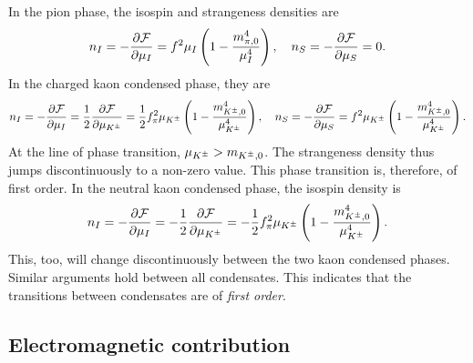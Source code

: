 In the pion phase, the isospin and strangeness densities are
%
\begin{equation}
    n_I = - \pdv{\mathcal{F}}{\mu_I} = f^2 \mu_I \left( 1 - \frac{m_{\pi,0}^4}{\mu_I^4} \right), \quad
    n_S = - \pdv{\mathcal{F}}{\mu_S} = 0.
\end{equation}
%
In the charged kaon condensed phase, they are
%
\begin{equation}
    n_I = - \pdv{\mathcal{F}}{\mu_I} 
    = \frac{1}{2} \pdv{\mathcal{F}}{\mu_{K^\pm}}
    = \frac{1}{2} f^2_\pi \mu_{K^\pm} \left( 1 - \frac{m_{{K^\pm},0}^4}{\mu_{K^\pm}^4} \right), \quad
    n_S = - \pdv{\mathcal{F}}{\mu_S} = f^2 \mu_{K^\pm}  \left( 1 - \frac{m_{{K^\pm},0}^4}{\mu_{K^\pm}^4} \right).
\end{equation}
%
At the line of phase transition, $\mu_{K^\pm} > m_{{K^\pm},0}$.
The strangeness density thus jumps discontinuously to a non-zero value.
This phase transition is, therefore, of first order.
In the neutral kaon condensed phase, the isospin density is
%
\begin{equation}
    n_I = - \pdv{\mathcal{F}}{\mu_I} 
    = -\frac{1}{2} \pdv{\mathcal{F}}{\mu_{K^\pm}}
    = - \frac{1}{2}  f^2_\pi \mu_{K^\pm} \left( 1 - \frac{m_{{K^\pm},0}^4}{\mu_{K^\pm}^4} \right).
\end{equation}
%
This, too, will change discontinuously between the two kaon condensed phases.
Similar arguments hold between all condensates.
This indicates that the transitions between condensates are of \emph{first order}.




\subsection{Electromagnetic contribution}

